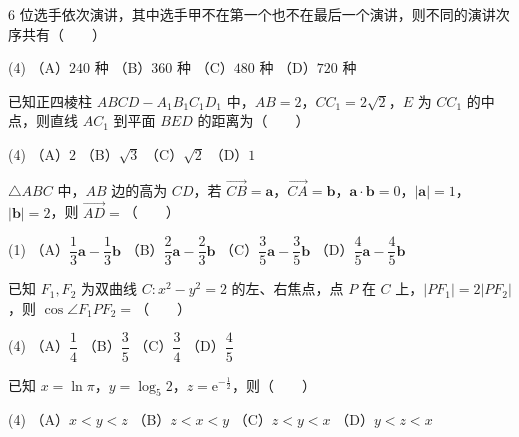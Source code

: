 \begin{question}
$6$ 位选手依次演讲，其中选手甲不在第一个也不在最后一个演讲，则不同的演讲次序共有\mbox{（　　）}

\begin{gkopts}(4)
\task （A）$240$ 种
\task （B）$360$ 种
\task （C）$480$ 种
\task （D）$720$ 种
\end{gkopts}

\end{question}
\begin{question}
已知正四棱柱 $ABCD-A_1B_1C_1D_1$ 中，$AB=2$，$CC_1=2\sqrt2$，$E$ 为 $CC_1$ 的中点，则直线 $AC_1$ 到平面 $BED$ 的距离为\mbox{（　　）}

\begin{gkopts}(4)
\task （A）$2$
\task （B）$\sqrt3$
\task （C）$\sqrt2$
\task （D）$1$
\end{gkopts}

\end{question}
\begin{question}
$\triangle ABC$ 中，$AB$ 边的高为 $CD$，若 $\overrightarrow{CB}=\boldsymbol a$，$\overrightarrow{CA}=\boldsymbol b$，$\boldsymbol a\cdot\boldsymbol b=0$，$|\boldsymbol a|=1$，$|\boldsymbol b|=2$，则 $\overrightarrow{AD}=$\mbox{（　　）}

\begin{gkopts}(1)
\task （A）$\dfrac13\boldsymbol a-\dfrac13\boldsymbol b$
\task （B）$\dfrac23\boldsymbol a-\dfrac23\boldsymbol b$
\task （C）$\dfrac35\boldsymbol a-\dfrac35\boldsymbol b$
\task （D）$\dfrac45\boldsymbol a-\dfrac45\boldsymbol b$
\end{gkopts}

\end{question}
\begin{question}
已知 $F_1,F_2$ 为双曲线 $C:x^2-y^2=2$ 的左、右焦点，点 $P$ 在 $C$ 上，$|PF_1|=2|PF_2|$，则 $\cos\angle F_1PF_2=$\mbox{（　　）}

\begin{gkopts}(4)
\task （A）$\dfrac14$
\task （B）$\dfrac35$
\task （C）$\dfrac34$
\task （D）$\dfrac45$
\end{gkopts}

\end{question}
\begin{question}
已知 $x=\ln\pi$，$y=\log_5 2$，$z=\mathrm e^{-\frac12}$，则\mbox{（　　）}

\begin{gkopts}(4)
\task （A）$x<y<z$
\task （B）$z<x<y$
\task （C）$z<y<x$
\task （D）$y<z<x$
\end{gkopts}

\end{question}
